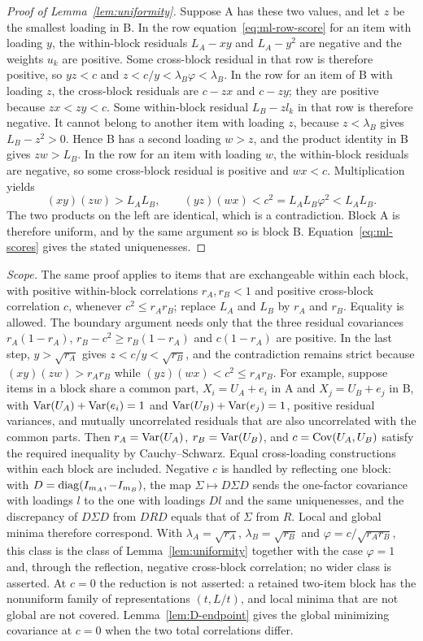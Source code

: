 \begin{proof}[Proof of Lemma~\ref{lem:uniformity}]
Suppose A has these two values, and let $z$ be the smallest loading in B. In the row equation~\eqref{eq:ml-row-score} for an item with loading $y$, the within-block residuals $L_A-xy$ and $L_A-y^2$ are negative and the weights $u_k$ are positive. Some cross-block residual in that row is therefore positive, so $yz<c$ and $z<c/y<\lambda_B\varphi<\lambda_B$. In the row for an item of B with loading $z$, the cross-block residuals are $c-zx$ and $c-zy$; they are positive because $zx<zy<c$. Some within-block residual $L_B-zl_k$ in that row is therefore negative. It cannot belong to another item with loading $z$, because $z<\lambda_B$ gives $L_B-z^2>0$. Hence B has a second loading $w>z$, and the product identity in B gives $zw>L_B$. In the row for an item with loading $w$, the within-block residuals are negative, so some cross-block residual is positive and $wx<c$. Multiplication yields
\[
(xy)(zw)>L_AL_B,
\qquad
(yz)(wx)<c^2=L_AL_B\varphi^2<L_AL_B.
\]
The two products on the left are identical, which is a contradiction. Block A is therefore uniform, and by the same argument so is block B. Equation~\eqref{eq:ml-scores} gives the stated uniquenesses.
\end{proof}

\textit{Scope.} The same proof applies to items that are exchangeable within each block, with positive within-block correlations $r_A,r_B<1$ and positive cross-block correlation $c$, whenever $c^2\le r_Ar_B$; replace $L_A$ and $L_B$ by $r_A$ and $r_B$. Equality is allowed. The boundary argument needs only that the three residual covariances $r_A(1-r_A)$, $r_B-c^2\ge r_B(1-r_A)$ and $c(1-r_A)$ are positive. In the last step, $y>\sqrt{r_A}$ gives $z<c/y<\sqrt{r_B}$, and the contradiction remains strict because $(xy)(zw)>r_Ar_B$ while $(yz)(wx)<c^2\le r_Ar_B$. For example, suppose items in a block share a common part, $X_i=U_A+e_i$ in A and $X_j=U_B+e_j$ in B, with $\operatorname{Var}(U_A)+\operatorname{Var}(e_i)=1$ and $\operatorname{Var}(U_B)+\operatorname{Var}(e_j)=1$, positive residual variances, and mutually uncorrelated residuals that are also uncorrelated with the common parts. Then $r_A=\operatorname{Var}(U_A)$, $r_B=\operatorname{Var}(U_B)$, and $c=\operatorname{Cov}(U_A,U_B)$ satisfy the required inequality by Cauchy--Schwarz. Equal cross-loading constructions within each block are included. Negative $c$ is handled by reflecting one block: with $D=\operatorname{diag}(I_{m_A},-I_{m_B})$, the map $\Sigma\mapsto D\Sigma D$ sends the one-factor covariance with loadings $l$ to the one with loadings $Dl$ and the same uniquenesses, and the discrepancy of $D\Sigma D$ from $DRD$ equals that of $\Sigma$ from $R$. Local and global minima therefore correspond. With $\lambda_A=\sqrt{r_A}$, $\lambda_B=\sqrt{r_B}$ and $\varphi=c/\sqrt{r_Ar_B}$, this class is the class of Lemma~\ref{lem:uniformity} together with the case $\varphi=1$ and, through the reflection, negative cross-block correlation; no wider class is asserted. At $c=0$ the reduction is not asserted: a retained two-item block has the nonuniform family of representations $(t,L/t)$, and local minima that are not global are not covered. Lemma~\ref{lem:D-endpoint} gives the global minimizing covariance at $c=0$ when the two total correlations differ.

